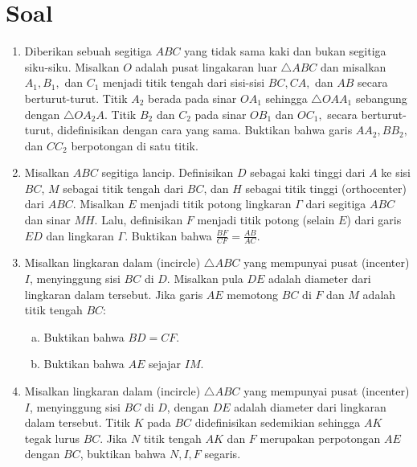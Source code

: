 \documentclass[11pt]{scrartcl}
\begin{document}
\section{Soal}
\begin{enumerate}
    \item Diberikan sebuah segitiga $ABC$ yang tidak sama kaki dan bukan segitiga siku-siku. Misalkan $O$ adalah pusat lingakaran luar $\triangle ABC$ dan misalkan $A_1, B_1,$ dan $C_1$ menjadi titik tengah dari sisi-sisi $BC,CA,$ dan $AB$ secara berturut-turut. Titik $A_2$ berada pada sinar $OA_1$ sehingga $\triangle OAA_1$ sebangung dengan $\triangle OA_2A$. Titik $B_2$ dan $C_2$ pada sinar $OB_1$ dan $OC_1,$ secara berturut-turut, didefinisikan dengan cara yang sama. Buktikan bahwa garis $AA_2, BB_2,$ dan $CC_2$ berpotongan di satu titik.

    \item Misalkan $ ABC $ segitiga lancip. Definisikan $ D $ sebagai kaki tinggi dari $ A $ ke sisi $ BC $, $M$ sebagai titik tengah dari $ BC $, dan $ H $ sebagai titik tinggi (orthocenter) dari $ ABC $. Misalkan $ E $ menjadi titik potong lingkaran $ \Gamma $ dari segitiga $ ABC $ dan sinar $ MH $. Lalu, definisikan $ F $ menjadi titik potong (selain $E$) dari garis $ ED $ dan lingkaran $ \Gamma $. Buktikan bahwa $ \tfrac{BF}{CF} = \tfrac{AB}{AC} $.
    \item Misalkan lingkaran dalam (incircle) $\triangle ABC$ yang mempunyai pusat (incenter) $I$, menyinggung sisi $BC$ di $D$. Misalkan pula $DE$ adalah diameter dari lingkaran dalam tersebut. Jika garis $AE$ memotong $BC$ di $F$ dan $M$ adalah titik tengah $BC$:
    \begin{enumerate}[(a)]
        \item Buktikan bahwa $BD=CF$.
        \item Buktikan bahwa $AE$ sejajar $IM$.
    \end{enumerate}

    \item Misalkan lingkaran dalam (incircle) $\triangle ABC$ yang mempunyai pusat (incenter) $I$, menyinggung sisi $BC$ di $D$, dengan $DE$ adalah diameter dari lingkaran dalam tersebut. Titik $K$ pada $BC$ didefinisikan sedemikian sehingga $AK$ tegak lurus $BC$. Jika $N$ titik tengah $AK$ dan $F$ merupakan perpotongan $AE$ dengan $BC$, buktikan bahwa $N,I,F$ segaris.
\end{enumerate}
\end{document}

